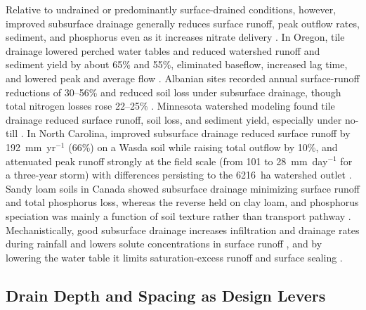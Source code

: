 \documentclass[11pt]{article}
\begin{document}
Relative to undrained or predominantly surface-drained conditions, however,
improved subsurface drainage generally reduces surface runoff, peak outflow
rates, sediment, and phosphorus even as it increases nitrate delivery
\parencite{FAUSEY1995,SKAGGS1994,THOMAS1995,Gramlich2018}. In Oregon, tile
drainage lowered perched water tables and reduced watershed runoff and sediment
yield by about 65\% and 55\%, eliminated baseflow, increased lag time, and
lowered peak and average flow \parencite{ISTOK1983}. Albanian sites recorded
annual surface-runoff reductions of 30--56\% and reduced soil loss under
subsurface drainage, though total nitrogen losses rose 22--25\%
\parencite{Grazhdani1996}. Minnesota watershed modeling found tile drainage
reduced surface runoff, soil loss, and sediment yield, especially under no-till
\parencite{Maalim2013}. In North Carolina, improved subsurface drainage reduced
surface runoff by 192~mm~yr$^{-1}$ (66\%) on a Wasda soil while raising total
outflow by 10\%, and attenuated peak runoff strongly at the field scale (from
101 to 28~mm~day$^{-1}$ for a three-year storm) with differences persisting to
the 6216~ha watershed outlet \parencite{KONYHA1992}. Sandy loam soils in Canada
showed subsurface drainage minimizing surface runoff and total phosphorus loss,
whereas the reverse held on clay loam, and phosphorus speciation was mainly a
function of soil texture rather than transport pathway
\parencite{Eastman2010}. Mechanistically, good subsurface drainage increases
infiltration and drainage rates during rainfall and lowers solute concentrations
in surface runoff \parencite{Tong2016,Tao2017}, and by lowering the water table
it limits saturation-excess runoff and surface sealing \parencite{Augeard2005}.

\subsection{Drain Depth and Spacing as Design Levers}
\end{document}
